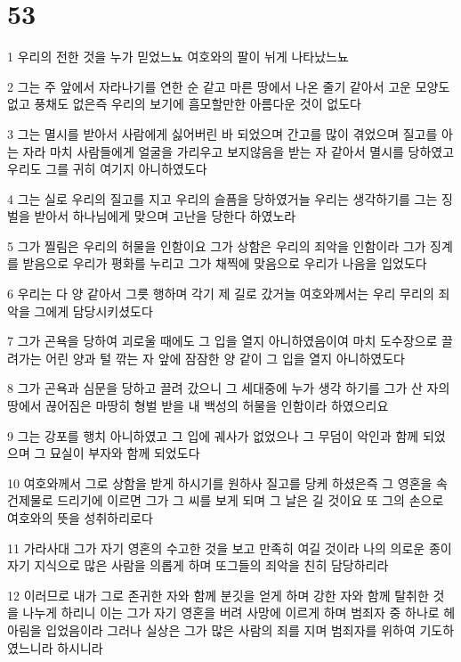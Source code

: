 \chapter{53}

\par 1 우리의 전한 것을 누가 믿었느뇨 여호와의 팔이 뉘게 나타났느뇨
\par 2 그는 주 앞에서 자라나기를 연한 순 같고 마른 땅에서 나온 줄기 같아서 고운 모양도 없고 풍채도 없은즉 우리의 보기에 흠모할만한 아름다운 것이 없도다
\par 3 그는 멸시를 받아서 사람에게 싫어버린 바 되었으며 간고를 많이 겪었으며 질고를 아는 자라 마치 사람들에게 얼굴을 가리우고 보지않음을 받는 자 같아서 멸시를 당하였고 우리도 그를 귀히 여기지 아니하였도다
\par 4 그는 실로 우리의 질고를 지고 우리의 슬픔을 당하였거늘 우리는 생각하기를 그는 징벌을 받아서 하나님에게 맞으며 고난을 당한다 하였노라
\par 5 그가 찔림은 우리의 허물을 인함이요 그가 상함은 우리의 죄악을 인함이라 그가 징계를 받음으로 우리가 평화를 누리고 그가 채찍에 맞음으로 우리가 나음을 입었도다
\par 6 우리는 다 양 같아서 그릇 행하며 각기 제 길로 갔거늘 여호와께서는 우리 무리의 죄악을 그에게 담당시키셨도다
\par 7 그가 곤욕을 당하여 괴로울 때에도 그 입을 열지 아니하였음이여 마치 도수장으로 끌려가는 어린 양과 털 깎는 자 앞에 잠잠한 양 같이 그 입을 열지 아니하였도다
\par 8 그가 곤욕과 심문을 당하고 끌려 갔으니 그 세대중에 누가 생각 하기를 그가 산 자의 땅에서 끊어짐은 마땅히 형벌 받을 내 백성의 허물을 인함이라 하였으리요
\par 9 그는 강포를 행치 아니하였고 그 입에 궤사가 없었으나 그 무덤이 악인과 함께 되었으며 그 묘실이 부자와 함께 되었도다
\par 10 여호와께서 그로 상함을 받게 하시기를 원하사 질고를 당케 하셨은즉 그 영혼을 속건제물로 드리기에 이르면 그가 그 씨를 보게 되며 그 날은 길 것이요 또 그의 손으로 여호와의 뜻을 성취하리로다
\par 11 가라사대 그가 자기 영혼의 수고한 것을 보고 만족히 여길 것이라 나의 의로운 종이 자기 지식으로 많은 사람을 의롭게 하며 또그들의 죄악을 친히 담당하리라
\par 12 이러므로 내가 그로 존귀한 자와 함께 분깃을 얻게 하며 강한 자와 함께 탈취한 것을 나누게 하리니 이는 그가 자기 영혼을 버려 사망에 이르게 하며 범죄자 중 하나로 헤아림을 입었음이라 그러나 실상은 그가 많은 사람의 죄를 지며 범죄자를 위하여 기도하였느니라 하시니라


